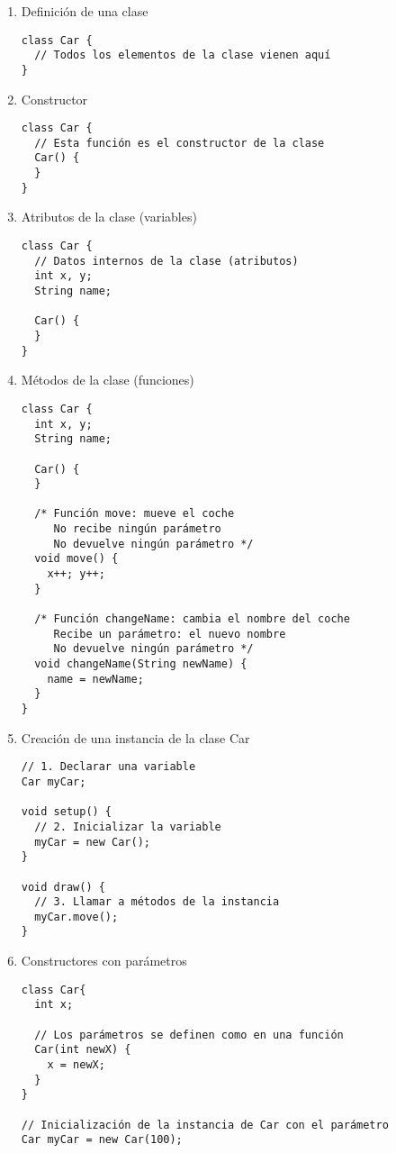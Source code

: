 \documentclass[a4paper,oneside]{article}
\begin{document}
\begin{enumerate}

  \item Definición de una clase

    \begin{verbatim}
class Car {
  // Todos los elementos de la clase vienen aquí
}
    \end{verbatim}

  \item Constructor

    \begin{verbatim}
class Car {
  // Esta función es el constructor de la clase
  Car() {
  }
}
    \end{verbatim}

  \item Atributos de la clase (variables)

    \begin{verbatim}
class Car {
  // Datos internos de la clase (atributos)
  int x, y;
  String name;

  Car() {
  }
}
    \end{verbatim}

  \item Métodos de la clase (funciones)

    \begin{verbatim}
class Car {
  int x, y;
  String name;

  Car() {
  }

  /* Función move: mueve el coche
     No recibe ningún parámetro
     No devuelve ningún parámetro */
  void move() {
    x++; y++;
  }

  /* Función changeName: cambia el nombre del coche
     Recibe un parámetro: el nuevo nombre
     No devuelve ningún parámetro */
  void changeName(String newName) {
    name = newName;
  }
}
    \end{verbatim}

\newpage

  \item Creación de una instancia de la clase Car

    \begin{verbatim}
// 1. Declarar una variable
Car myCar;

void setup() {
  // 2. Inicializar la variable
  myCar = new Car();
}

void draw() {
  // 3. Llamar a métodos de la instancia
  myCar.move();
}
    \end{verbatim}

  \item Constructores con parámetros

    \begin{verbatim}
class Car{
  int x;

  // Los parámetros se definen como en una función
  Car(int newX) {
    x = newX;
  }
}

// Inicialización de la instancia de Car con el parámetro
Car myCar = new Car(100);
    \end{verbatim}

\end{enumerate}
\end{document}
